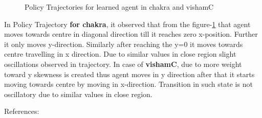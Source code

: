 \documentclass[preprint,12pt]{elsarticle}
\begin{document}
 
 \begin{figure}[H]
 	\centering  
 	\caption{Policy Trajectories for learned agent in chakra and vishamC}
 	\label{fig:Ptraj}
 \end{figure}
	
	In Policy Trajectory \textbf{for chakra}, it observed that from the figure-\ref{fig:Ptraj} that agent moves towards centre in diagonal direction till it reaches zero x-position. Further it only moves y-direction. Similarly after reaching the y=0 it moves towards centre travelling in x direction. Due to similar values in close region slight oscillations observed in trajectory. In case of \textbf{vishamC}, due to more weight toward y skewness is created thus agent moves in y direction after that it starts moving towards centre by moving in x-direction. Transition in such state is not oscillatory due to similar values in close region.
	
	\newpage
	
	References:
	\\
	
	
	
	
						
	
	
	
	
	
\end{document}
